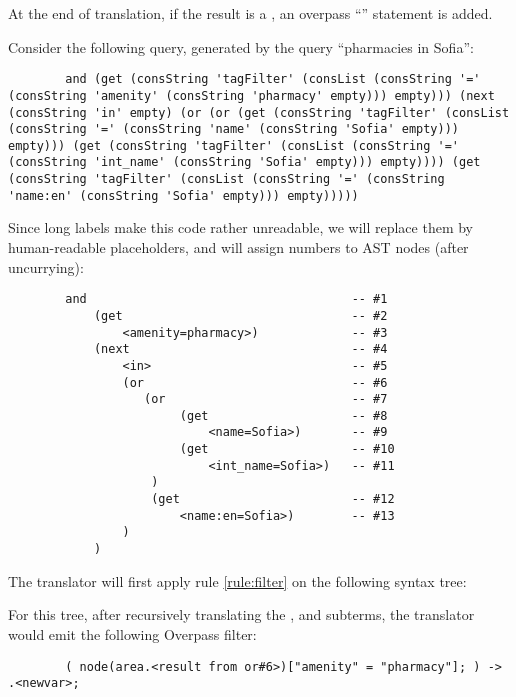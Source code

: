 \documentclass[main.tex]{subfiles}
\begin{document}
At the end of translation, if the result is a , an overpass
``'' statement is added.

\begin{example}
    Consider the following query, generated by the query ``pharmacies in Sofia'':
    \begin{lstlisting}
        and (get (consString 'tagFilter' (consList (consString '=' (consString 'amenity' (consString 'pharmacy' empty))) empty))) (next (consString 'in' empty) (or (or (get (consString 'tagFilter' (consList (consString '=' (consString 'name' (consString 'Sofia' empty))) empty))) (get (consString 'tagFilter' (consList (consString '=' (consString 'int_name' (consString 'Sofia' empty))) empty)))) (get (consString 'tagFilter' (consList (consString '=' (consString 'name:en' (consString 'Sofia' empty))) empty)))))
    \end{lstlisting}
    Since long labels make this code rather unreadable, we will replace them
    by human-readable placeholders, and will assign numbers to AST nodes
    (after uncurrying):
    \begin{lstlisting}
        and                                     -- #1
            (get                                -- #2
                <amenity=pharmacy>)             -- #3
            (next                               -- #4
                <in>                            -- #5
                (or                             -- #6
                   (or                          -- #7
                        (get                    -- #8
                            <name=Sofia>)       -- #9
                        (get                    -- #10
                            <int_name=Sofia>)   -- #11
                    ) 
                    (get                        -- #12
                        <name:en=Sofia>)        -- #13
                )
            )
    \end{lstlisting}
    
    The translator will first apply rule \ref{rule:filter} on the following
    syntax tree:
    
    For this tree, after recursively translating the ,
     and  subterms, the translator
    would emit the following Overpass filter:
    \begin{lstlisting}
        ( node(area.<result from or#6>)["amenity" = "pharmacy"]; ) -> .<newvar>;
    \end{lstlisting}
    

\end{example}
\end{document}
